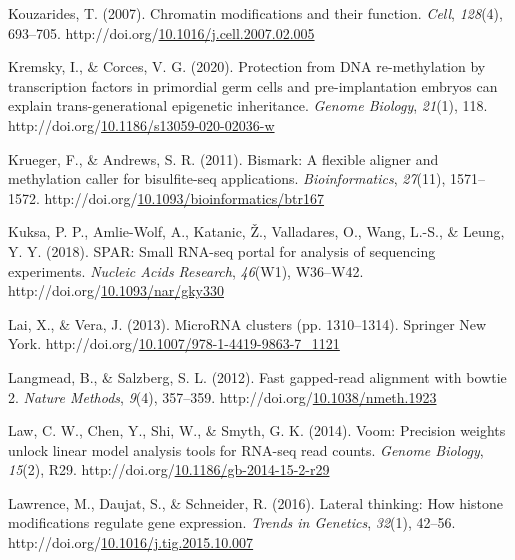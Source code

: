 \documentclass[12pt,twoside]{reedthesis}
\newlength{\cslhangindent}
\newenvironment{CSLReferences}[2] %
 {%
  \setlength{\parindent}{0pt}
  \ifodd #1 \everypar{\setlength{\hangindent}{\cslhangindent}}\ignorespaces\fi
  \ifnum #2 > 0
  \setlength{\parskip}{#2\baselineskip}
  \fi
 }%
 {}
\begin{document}
\begin{CSLReferences}{1}{0}
\leavevmode{}%
Kouzarides, T. (2007). Chromatin modifications and their function. \emph{Cell}, \emph{128}(4), 693--705. http://doi.org/\href{https://doi.org/10.1016/j.cell.2007.02.005}{10.1016/j.cell.2007.02.005}

\leavevmode{}%
Kremsky, I., \& Corces, V. G. (2020). Protection from DNA re-methylation by transcription factors in primordial germ cells and pre-implantation embryos can explain trans-generational epigenetic inheritance. \emph{Genome Biology}, \emph{21}(1), 118. http://doi.org/\href{https://doi.org/10.1186/s13059-020-02036-w}{10.1186/s13059-020-02036-w}

\leavevmode{}%
Krueger, F., \& Andrews, S. R. (2011). Bismark: A flexible aligner and methylation caller for bisulfite-seq applications. \emph{Bioinformatics}, \emph{27}(11), 1571--1572. http://doi.org/\href{https://doi.org/10.1093/bioinformatics/btr167}{10.1093/bioinformatics/btr167}

\leavevmode{}%
Kuksa, P. P., Amlie-Wolf, A., Katanic, Ž., Valladares, O., Wang, L.-S., \& Leung, Y. Y. (2018). SPAR: Small RNA-seq portal for analysis of sequencing experiments. \emph{Nucleic Acids Research}, \emph{46}(W1), W36--W42. http://doi.org/\href{https://doi.org/10.1093/nar/gky330}{10.1093/nar/gky330}

\leavevmode{}%
Lai, X., \& Vera, J. (2013). MicroRNA clusters (pp. 1310--1314). Springer New York. http://doi.org/\href{https://doi.org/10.1007/978-1-4419-9863-7_1121}{10.1007/978-1-4419-9863-7\_1121}

\leavevmode{}%
Langmead, B., \& Salzberg, S. L. (2012). Fast gapped-read alignment with bowtie 2. \emph{Nature Methods}, \emph{9}(4), 357--359. http://doi.org/\href{https://doi.org/10.1038/nmeth.1923}{10.1038/nmeth.1923}

\leavevmode{}%
Law, C. W., Chen, Y., Shi, W., \& Smyth, G. K. (2014). Voom: Precision weights unlock linear model analysis tools for RNA-seq read counts. \emph{Genome Biology}, \emph{15}(2), R29. http://doi.org/\href{https://doi.org/10.1186/gb-2014-15-2-r29}{10.1186/gb-2014-15-2-r29}

\leavevmode{}%
Lawrence, M., Daujat, S., \& Schneider, R. (2016). Lateral thinking: How histone modifications regulate gene expression. \emph{Trends in Genetics}, \emph{32}(1), 42--56. http://doi.org/\href{https://doi.org/10.1016/j.tig.2015.10.007}{10.1016/j.tig.2015.10.007}


\end{CSLReferences}
\end{document}
